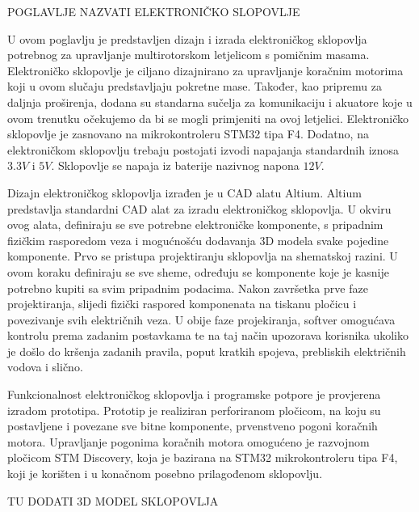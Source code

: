 \documentclass[11pt,a4paper]{article}
\begin{document}
POGLAVLJE NAZVATI ELEKTRONIČKO SLOPOVLJE

U ovom poglavlju je predstavljen dizajn i izrada elektroničkog sklopovlja potrebnog za upravljanje multirotorskom letjelicom s pomičnim masama. Elektroničko sklopovlje je ciljano dizajnirano za upravljanje koračnim motorima koji u ovom slučaju predstavljaju pokretne mase. Također, kao pripremu za daljnja proširenja, dodana su standarna sučelja za komunikaciju i akuatore koje u ovom trenutku očekujemo da bi se mogli primjeniti na ovoj letjelici. Elektroničko sklopovlje je zasnovano na mikrokontroleru STM32 tipa F4. Dodatno, na elektroničkom sklopovlju trebaju postojati izvodi napajanja standardnih iznosa $3.3 V$ i $5 V$. Sklopovlje se napaja iz baterije nazivnog napona $12 V$. 

Dizajn elektroničkog sklopovlja izrađen je u CAD alatu Altium. Altium predstavlja standardni CAD alat za izradu elektroničkog sklopovlja. U okviru ovog alata, definiraju se sve potrebne elektroničke komponente, s pripadnim fizičkim rasporedom veza i mogućnošću dodavanja 3D modela svake pojedine komponente. Prvo se pristupa projektiranju sklopovlja na shematskoj razini. U ovom koraku definiraju se sve sheme, određuju se komponente koje je kasnije potrebno kupiti sa svim pripadnim podacima. Nakon završetka prve faze projektiranja, slijedi fizički raspored komponenata na tiskanu pločicu i povezivanje svih električnih veza. U obije faze projekiranja, softver omogućava kontrolu prema zadanim postavkama te na taj način upozorava korisnika ukoliko je došlo do kršenja zadanih pravila, poput kratkih spojeva, prebliskih električnih vodova i slično.

Funkcionalnost elektroničkog sklopovlja i programske potpore je provjerena izradom prototipa. Prototip je realiziran perforiranom pločicom, na koju su postavljene i povezane sve bitne komponente, prvenstveno pogoni koračnih motora. Upravljanje pogonima koračnih motora omogućeno je razvojnom pločicom STM Discovery, koja je bazirana na STM32 mikrokontroleru tipa F4, koji je korišten i u konačnom posebno prilagođenom sklopovlju.

TU DODATI 3D MODEL SKLOPOVLJA
\end{document}
